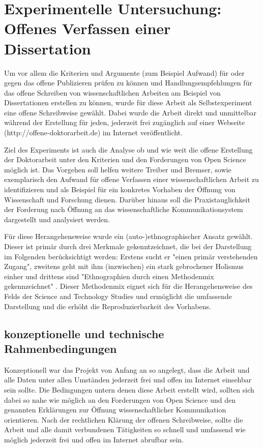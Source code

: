 \chapter{Experimentelle Untersuchung: Offenes Verfassen einer Dissertation}

Um vor allem die Kriterien und Argumente (zum Beispiel Aufwand) für oder gegen das offene Publizieren prüfen zu können und Handlungsempfehlungen für das offene Schreiben von wissenschaftlichen Arbeiten am Beispiel von Dissertationen erstellen zu können, wurde für diese Arbeit als Selbstexperiment eine offene Schreibweise gewählt. Dabei wurde die Arbeit direkt und unmittelbar während der Erstellung für jeden, jederzeit frei zugänglich auf einer Webseite (http://offene-doktorarbeit.de) im Internet veröffentlicht.

Ziel des Experiments ist auch die Analyse ob und wie weit die offene Erstellung der Doktorarbeit unter den Kriterien und den Forderungen von Open Science möglich ist. Das Vorgehen soll helfen weitere Treiber und Bremser, sowie exemplarisch den Aufwand für offene Verfassen einer wissenschaftlichen Arbeit zu identifizieren und als Beispiel für ein konkretes Vorhaben der Öffnung von Wissenschaft und Forschung dienen. Darüber hinaus soll die Praxistauglichkeit der Forderung nach Öffnung an das wissenschaftliche Kommunikationsystem dargestellt und analysiert werden.

Für diese Herangehensweise wurde ein (auto-)ethnographischer Ansatz gewählt. Dieser ist primär durch drei Merkmale gekenntzeichnet, die bei der Darstellung im Folgenden berücksichtigt werden:  Erstens sucht er  "einen primär verstehenden Zugang", zweitens geht mit ihm (inzwischen) ein stark gebrochener Holismus einher und drittens sind "Ethnographien durch einen Methodenmix gekennzeichnet" \cite{bachmann_2011_ethnographie}. Dieser Methodenmix eignet sich für die Herangehensweise des Felds der Science and Technology Studies und ermöglicht die umfassende Darstellung und die erhöht die Reproduzierbarkeit des Vorhabens.

\section{konzeptionelle und technische Rahmenbedingungen}

Konzeptionell war das Projekt von Anfang an so angelegt, dass die Arbeit und alle Daten unter allen Umständen jederzeit frei und offen im Internet einsehbar sein sollte. Die Bedingungen untern denen diese Arbeit erstellt wird, sollten sich dabei so nahe wie möglich an den Forderungen von Open Science und den genannten Erklärungen zur Öffnung wissenschaftlicher Kommunikation orientieren. Nach der rechtlichen Klärung der offenen Schreibweise, sollte die Arbeit und alle damit verbundenen Tätigkeiten so schnell und umfassend wie möglich jederzeit frei und offen im Internet abrufbar sein.

